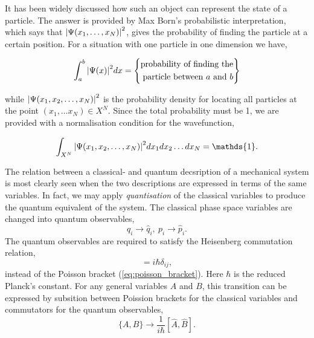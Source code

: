    It has been widely discussed how such an object can represent the state of a 
    particle. The answer is provided by Max Born's probabilistic interpretation,
    which says that $\abs{\Psi(x_1, \dots, x_N)}^2$, gives the probability of finding
    the particle at a certain position. For a situation with one particle in one
    dimension we have,

    \begin{equation}
        \int_a^b \abs{\Psi(x)}^2 dx = 
        \left\{\begin{aligned}
            \text{probability of finding the} \\
            \text{particle between $a$ and $b$}
        \end{aligned}\right\}
    \end{equation}

    while $\abs{\Psi(x_1, x_2, \dots, x_N)}^2$ is the probability density for locating
    all particles at the point $(x_1, \dots x_N) \in X^N$. Since the total probability
    must be 1, we are provided with a normalisation condition for the wavefunction,
    
    \begin{equation}
        \int_{X^N} \abs{\Psi(x_1, x_2, \dots, x_N)}^2 dx_1 dx_2\dots dx_N = \mathds{1}.
    \end{equation}

    The relation between a classical- and quantum decsription of a mechanical system 
    is most clearly seen when the two descriptions are expressed in terms of the same 
    variables. In fact, we may apply \emph{quantisation} of the classical variables to 
    produce the quantum equivalent of the system. The classical phase space variables 
    are changed into quantum observables,
    \begin{equation}
        q_i \to \hat{q}_i, \ p_i \to \hat{p}_i.
    \end{equation}
    The quantum observables are required to satisfy the Heisenberg commutation relation,
    \begin{equation}
        [\hat{q}_i, \hat{p}_j] = i \hbar \delta_{ij},
    \end{equation}
    instead of the Poisson bracket (\autoref{eq:poisson_bracket}). Here $\hbar$ is the 
    reduced Planck's constant. For any general variables $A$ and $B$, this 
    transition can be expressed by subsition between Poission brackets for the 
    classical variables and commutators for the quantum observables,
    \begin{equation}
        \{A, B\} \to \frac{1}{i\hbar}[\hat{A},\hat{B}].
    \end{equation}


